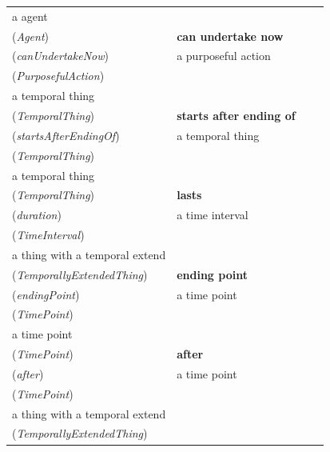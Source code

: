 \documentclass{svmult}
\begin{document}
\begin{table}[h]
\begin{tabular}{p{3cm}p{6cm}p{3cm}l}
 \\ 


 a agent
\\ (\emph{Agent})  & 

\textbf{can undertake now}
\\ (\emph{canUndertakeNow})  & 

 a purposeful action
\\ (\emph{PurposefulAction})  & 

 \\ 


 a temporal thing
\\ (\emph{TemporalThing})  & 

\textbf{starts after ending of}
\\ (\emph{startsAfterEndingOf})  & 

 a temporal thing
\\ (\emph{TemporalThing})  & 

 \\ 


 a temporal thing
\\ (\emph{TemporalThing})  & 

\textbf{lasts}
\\ (\emph{duration})  & 

 a time interval
\\ (\emph{TimeInterval})  & 

 \\ 


 a thing with a temporal extend
\\ (\emph{TemporallyExtendedThing})  & 

\textbf{ending point}
\\ (\emph{endingPoint})  & 

 a time point
\\ (\emph{TimePoint})  & 

 \\ 


 a time point
\\ (\emph{TimePoint})  & 

\textbf{after}
\\ (\emph{after})  & 

 a time point
\\ (\emph{TimePoint})  & 

 \\ 


 a thing with a temporal extend
\\ (\emph{TemporallyExtendedThing})  & 


\end{tabular}
\end{table}
\end{document}
